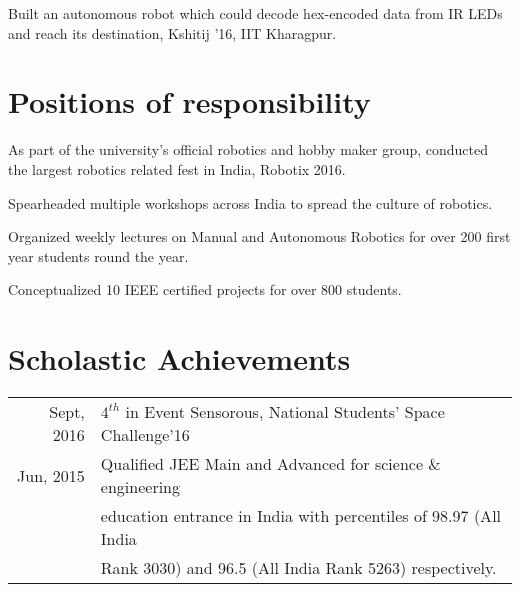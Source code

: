 \documentclass[letterpaper]{aman}
\begin{document}
\begin{minipage}[t]{0.599\textwidth}
\begin{tightemize}
\item Built an autonomous robot which could decode hex-encoded data from IR LEDs and reach its destination, Kshitij ’16, IIT Kharagpur.
\end{tightemize}
\sectionsep

\section{Positions of responsibility}

\begin{tightemize}
\item As part of the university’s official robotics and hobby maker group, conducted the largest robotics related fest in India, Robotix 2016.
\item Spearheaded multiple workshops across India to spread the culture of robotics.
\end{tightemize}
\sectionsep 

\begin{tightemize}
\item Organized weekly lectures on Manual and Autonomous Robotics for over 200 first year students round the year.
\item Conceptualized 10 IEEE certified projects for over 800 students.
\end{tightemize}
\sectionsep 

\section{Scholastic Achievements}
\begin{tabular}{rl}
Sept, 2016 & $4^{th}$ in Event Sensorous, National Students' Space Challenge'16\\
Jun, 2015 & Qualified JEE Main and Advanced for science \& engineering\\
         &  education entrance in India with percentiles of 98.97 (All India \\
& Rank 3030) and 96.5 (All India Rank 5263) respectively.\\
\end{tabular}


\end{minipage} 
\end{document}
